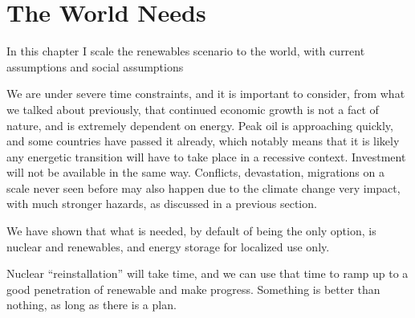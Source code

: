 \setchapterpreamble[u]{\margintoc}
\chapter{The World Needs}

In this chapter I scale the renewables scenario to the world, with current assumptions and social assumptions


We are under severe time constraints, and it is important to consider, from what we talked about previously, that continued economic growth is not a fact of nature, and is extremely dependent on energy. Peak oil is approaching quickly, and some countries have passed it already, which notably means that it is likely any energetic transition will have to take place in a recessive context. Investment will not be available in the same way. Conflicts, devastation, migrations on a scale never seen before may also happen due to the climate change very impact, with much stronger hazards, as discussed in a previous section.

We have shown that what is needed, by default of being the only option, is nuclear and renewables, and energy storage for localized use only.

Nuclear “reinstallation” will take time, and we can use that time to ramp up to a good penetration of renewable and make progress. Something is better than nothing, as long as there is a plan.
